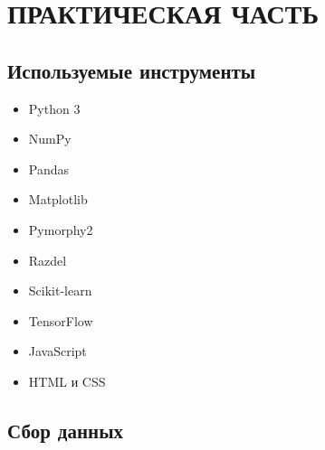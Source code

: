 \section{ПРАКТИЧЕСКАЯ ЧАСТЬ}
\vspace{-1.3cm}

\subsection{Используемые инструменты}

\begin{itemize}
 \item Python 3


 \item NumPy


 \item Pandas


 \item Matplotlib


 \item Pymorphy2


 \item Razdel


 \item Scikit-learn


 \item TensorFlow


 \item JavaScript


 \item HTML и CSS
\end{itemize}


%


\subsection{Сбор данных}


